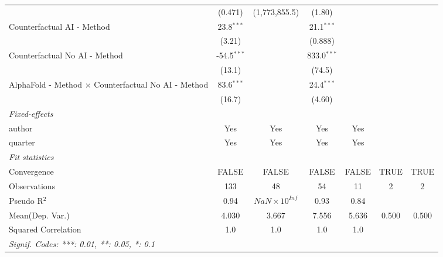 \begin{tabular}{lcccccc}
                                                              & (0.471)       & (1,773,855.5)         & (1.80)        &         &      &   \\   
   Counterfactual AI - Method                                 & 23.8$^{***}$  &                       & 21.1$^{***}$  &         &      &   \\   
                                                              & (3.21)        &                       & (0.888)       &         &      &   \\   
   Counterfactual No AI - Method                              & -54.5$^{***}$ &                       & 833.0$^{***}$ &         &      &   \\   
                                                              & (13.1)        &                       & (74.5)        &         &      &   \\   
   AlphaFold - Method $\times$ Counterfactual No AI - Method  & 83.6$^{***}$  &                       & 24.4$^{***}$  &         &      &   \\   
                                                              & (16.7)        &                       & (4.60)        &         &      &   \\   
   \midrule
   \emph{Fixed-effects}\\
   author                                                     & Yes           & Yes                   & Yes           & Yes     &      & \\  
   quarter                                                    & Yes           & Yes                   & Yes           & Yes     &      & \\  
   \midrule
   \emph{Fit statistics}\\
   Convergence                                                &FALSE          & FALSE                 & FALSE         & FALSE   & TRUE & TRUE\\  
   Observations                                               & 133           & 48                    & 54            & 11      & 2    & 2\\  
   Pseudo R$^2$                                               & 0.94          & $NaN\times 10^{Inf}$  & 0.93          & 0.84    &      & \\  
Mean(Dep. Var.) & 4.030 & 3.667 & 7.556 & 5.636 & 0.500 & 0.500 \\
   Squared Correlation                                        & 1.0           & 1.0                   & 1.0           & 1.0     &      & \\  
   \midrule \midrule
   \multicolumn{7}{l}{\emph{Signif. Codes: ***: 0.01, **: 0.05, *: 0.1}}\\
\end{tabular}
\par\endgroup
